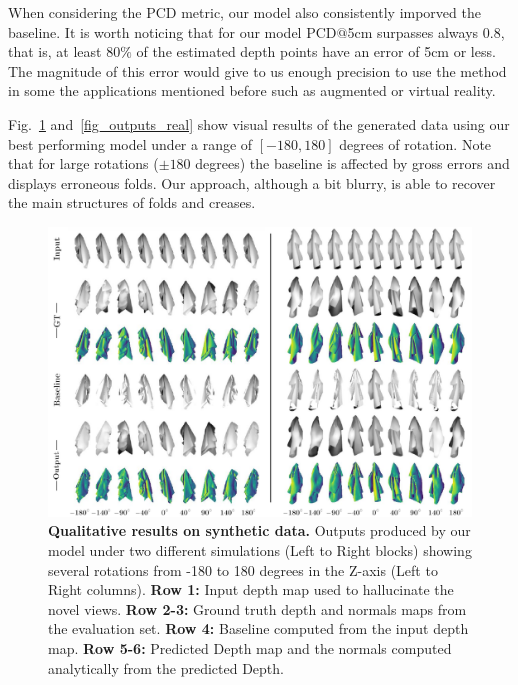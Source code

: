 When considering the PCD metric, our model also consistently imporved the baseline. It is  worth noticing that for our model PCD$@$5cm surpasses always 0.8, that is, at least $80\%$ of the estimated depth points have an error of 5cm or less. The magnitude of this error would give to us enough precision to use the method in some the applications mentioned before such as augmented or virtual reality.

Fig.~\ref{fig_outputs_synthetic} and~\ref{fig_outputs_real} show visual results of the generated data using our best performing model under a range  of $[-180,180]$ degrees of rotation. Note that for large rotations ($\pm 180$ degrees) the baseline is affected by gross errors and displays erroneous folds. Our approach, although a bit blurry, is able to recover the main structures of folds and creases.

\begin{figure}[!h]
\begin{center}
    \includegraphics[width=\linewidth]{main/chapter04/data/ipalm_cvpr_grid_synth_vertical.pdf}
    \caption[Qualitative results on synthetic data]{{\bf Qualitative results on synthetic data.} Outputs produced by our model under two different simulations (Left to Right blocks) showing several rotations from -180 to 180 degrees in the Z-axis (Left to Right columns). \textbf{Row 1:} Input depth map used to hallucinate the novel views. \textbf{Row 2-3:} Ground truth depth and normals maps from the evaluation set. \textbf{Row 4:} Baseline computed from the input depth map. \textbf{Row 5-6:} Predicted Depth map and the normals computed analytically from the predicted Depth.}
    \label{fig_outputs_synthetic}
\end{center}
\end{figure}

